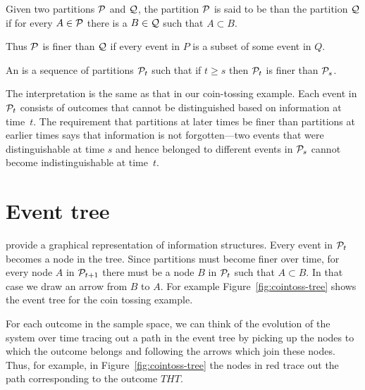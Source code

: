 \documentclass[11pt,reqno,openany]{amsbook}
\begin{document}
\begin{defn}[Fineness]
  Given two partitions $\mathcal{P}$ and $\mathcal{Q}$, the
  partition $\mathcal{P}$ is said to be  than
  the partition $\mathcal{Q}$ if for every $A \in \mathcal{P}$
  there is a $B \in \mathcal{Q}$ such that $A \subset B$.
\end{defn}
Thus $\mathcal{P}$ is finer than $\mathcal{Q}$ if every event
in $P$ is a subset of some event in $Q$.

\begin{defn}
  An  is a sequence of
  partitions $\mathcal{P}_t$ such that if $t \ge s$ then
  $\mathcal{P}_t$ is finer than $\mathcal{P}_s$.
\end{defn}
The interpretation is the same as that in our coin-tossing
example. Each event in $\mathcal{P}_t$ consists of outcomes
that cannot be distinguished based on information at
time~$t$. The requirement that partitions at later times be
finer than partitions at earlier times says that information
is not forgotten---two events that were distinguishable at
time $s$ and hence belonged to different events in
$\mathcal{P}_s$ cannot become indistinguishable at time~$t$.

\section{Event tree}
 provide a graphical representation of
information structures. Every event in $\mathcal{P}_t$ becomes
a node in the tree. Since partitions must become finer over
time, for every node $A$ in $\mathcal{P}_{t+1}$
there must be a node $B$ in $\mathcal{P}_t$ such that $A
\subset B$. In that case we draw an arrow from $B$ to $A$.
For example Figure~\ref{fig:cointoss-tree} shows the event
tree for the coin tossing example.

For each outcome in the sample space, we can think of the
evolution of the system over time tracing out a
path in the event tree by picking up the nodes to which the
outcome belongs and following the arrows which join these
nodes. Thus, for example, in Figure~\ref{fig:cointoss-tree}
the nodes in red trace out the path corresponding to the
outcome $THT$. 
\end{document}
